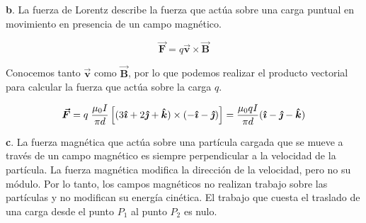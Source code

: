 \vspace{20px}
\textbf{b}. La fuerza de Lorentz describe la fuerza que actúa sobre una carga puntual en movimiento en presencia de un campo magnético.

\begin{equation*}
    \boldsymbol{\vec{F}} = q \boldsymbol{\vec{v}} \times \boldsymbol{\vec{B}}
\end{equation*}

Conocemos tanto $\boldsymbol{\vec{v}}$ como $\boldsymbol{\vec{B}}$, por lo que podemos realizar el producto vectorial para calcular la fuerza
que actúa sobre la carga $q$.

\begin{equation*}
    \boldsymbol{\vec{F}} = q \; \frac{\mu_{0} I}{\pi d} \left[(3 \boldsymbol{\hat{\imath}}
    + 2 \boldsymbol{\hat{\jmath}}  + \boldsymbol{\hat{k}})  \times \left( -\boldsymbol{\hat{\imath}} -\boldsymbol{\hat{\jmath}} \right)  \right] =
    \frac{\mu_{0} q I}{\pi d} (\boldsymbol{\hat{\imath}} - \boldsymbol{\hat{\jmath}} - \boldsymbol{\hat{k}} )
\end{equation*}

\vspace{20px}
\textbf{c}. La fuerza magnética que actúa sobre una partícula cargada que se mueve a través de un campo magnético es siempre perpendicular a la
velocidad de la partícula. La fuerza magnética modifica la dirección de la velocidad, pero no su módulo. Por lo tanto,
los campos magnéticos no realizan trabajo sobre las partículas y no modifican su energía cinética. El trabajo que cuesta el traslado
de una carga desde el punto $P_1$ al punto $P_2$ es nulo.